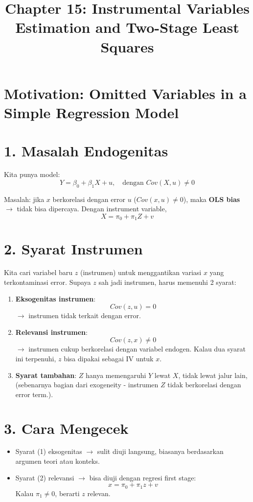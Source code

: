 \documentclass[]{article}
\title{Chapter 15: Instrumental Variables Estimation and Two-Stage Least Squares}
\author{}
\date{}
\begin{document}
\maketitle
 


\section{Motivation: Omitted Variables in a Simple Regression Model}
 

\section*{1. Masalah Endogenitas}
Kita punya model:
\[
Y = \beta_0 + \beta_1 X + u, \quad \text{dengan } Cov(X,u)\neq 0
\]

Masalah: jika $x$ berkorelasi dengan error $u$ \; ($Cov(x,u) \neq 0$), maka \textbf{OLS bias} $\rightarrow$ tidak bisa dipercaya.
Dengan instrument variable, 
\[
X = \pi_0 + \pi_1 Z + v
\]
\section*{2. Syarat Instrumen}
Kita cari variabel baru $z$ (instrumen) untuk menggantikan variasi $x$ yang terkontaminasi error. Supaya $z$ sah jadi instrumen, harus memenuhi 2 syarat:

\begin{enumerate}
    \item \textbf{Eksogenitas instrumen}: 
    \[
    Cov(z,u) = 0 
    \]
    $\rightarrow$ instrumen tidak terkait dengan error.
    
    \item \textbf{Relevansi instrumen}: 
    \[
    Cov(z,x) \neq 0
    \]
    $\rightarrow$ instrumen cukup berkorelasi dengan variabel endogen.
Kalau dua syarat ini terpenuhi, $z$ bisa dipakai sebagai IV untuk $x$.

    \item \textbf{Syarat tambahan}: $Z$ hanya memengaruhi $Y$ lewat $X$, tidak lewat jalur lain, (sebenarnya bagian dari exogeneity - instrumen $Z$ tidak berkorelasi dengan error term.).
\end{enumerate}


\section*{3. Cara Mengecek}
\begin{itemize}
    \item Syarat (1) eksogenitas $\rightarrow$ sulit diuji langsung, biasanya berdasarkan argumen teori atau konteks.
    \item Syarat (2) relevansi $\rightarrow$ bisa diuji dengan regresi first stage:
    \[
    x = \pi_0 + \pi_1 z + v
    \]
    Kalau $\pi_1 \neq 0$, berarti $z$ relevan.
\end{itemize}
\end{document}
